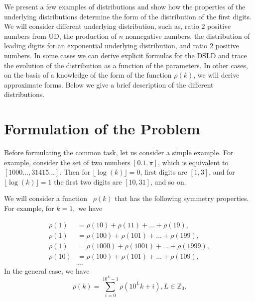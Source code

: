 \documentclass[titlepage,fleqn]{article}%
\providecommand{\U}[1]{\protect\rule{.1in}{.1in}}
\begin{document}
We present a few examples of distributions and show how the properties of the
underlying distributions determine the form of the distribution of the first
digits. We will consider different underlying distribution, such as, ratio $2$
positive numbers from UD, the production of $n$ nonnegative numbers, the
distribution of leading digits for an exponential underlying distribution, and
ratio $2$ positive numbers. In some cases we can derive explicit formulas for
the DSLD and trace the evolution of the distribution as a function of the
parameters. In other cases, on the basis of a knowledge of the form of the
function $\rho(k)$, we will derive approximate forms. Below we give a brief
description of the different distributions.

\section{Formulation of the Problem}%

\label{FormulationOf prob}%


Before formulating the common task, let us consider a simple example. For
example, consider the set of two numbers $[0.1,\pi]$, which is equivalent to
$[1000\ldots,31415\ldots]$. Then for $\lfloor\log(k)\rfloor=0$, first digits
are $[1,3]$, and for $\lfloor\log(k)\rfloor=1$ the first two digits are
$[10,31]$, and so on.

We will consider a function \ $\rho(k)$ that has the following symmetry
properties. For example, for $k=1,$ we have%

\begin{align}
\rho(1)  &  =\rho(10)+\rho(11)+\ldots+\rho(19),\label{Cond1}\\
\rho(1)  &  =\rho(100)+\rho(101)+\ldots+\rho(199),\nonumber\\
\rho(1)  &  =\rho(1000)+\rho(1001)+\ldots+\rho(1999),\nonumber\\
\rho(10)  &  =\rho(100)+\rho(101)+\ldots+\rho(109),\nonumber\\
&  \ldots\nonumber
\end{align}
In the general case, we have%
\begin{equation}
\rho(k)=%
{\displaystyle\sum\limits_{i=0}^{10^{L}-1}}
\rho(10^{L}k+i),L\in%
\mathbb{Z}
_{0}. \label{MainEq_1}%
\end{equation}
%
\end{document}
